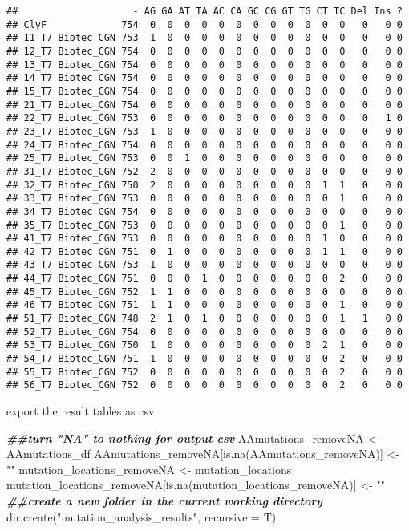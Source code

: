 \documentclass[
]{article}
\newenvironment{Shaded}{\begin{snugshade}}{\end{snugshade}}
\newcommand{\AttributeTok}[1]{\textcolor[rgb]{0.77,0.63,0.00}{#1}}
\newcommand{\DocumentationTok}[1]{\textcolor[rgb]{0.56,0.35,0.01}{\textbf{\textit{#1}}}}
\newcommand{\FunctionTok}[1]{\textcolor[rgb]{0.00,0.00,0.00}{#1}}
\newcommand{\NormalTok}[1]{#1}
\newcommand{\OtherTok}[1]{\textcolor[rgb]{0.56,0.35,0.01}{#1}}
\newcommand{\StringTok}[1]{\textcolor[rgb]{0.31,0.60,0.02}{#1}}
\begin{document}
\begin{verbatim}
##                    - AG GA AT TA AC CA GC CG GT TG CT TC Del Ins ?
## ClyF             754  0  0  0  0  0  0  0  0  0  0  0  0   0   0 0
## 11_T7 Biotec_CGN 753  1  0  0  0  0  0  0  0  0  0  0  0   0   0 0
## 12_T7 Biotec_CGN 754  0  0  0  0  0  0  0  0  0  0  0  0   0   0 0
## 13_T7 Biotec_CGN 754  0  0  0  0  0  0  0  0  0  0  0  0   0   0 0
## 14_T7 Biotec_CGN 754  0  0  0  0  0  0  0  0  0  0  0  0   0   0 0
## 15_T7 Biotec_CGN 754  0  0  0  0  0  0  0  0  0  0  0  0   0   0 0
## 21_T7 Biotec_CGN 754  0  0  0  0  0  0  0  0  0  0  0  0   0   0 0
## 22_T7 Biotec_CGN 753  0  0  0  0  0  0  0  0  0  0  0  0   0   1 0
## 23_T7 Biotec_CGN 753  1  0  0  0  0  0  0  0  0  0  0  0   0   0 0
## 24_T7 Biotec_CGN 754  0  0  0  0  0  0  0  0  0  0  0  0   0   0 0
## 25_T7 Biotec_CGN 753  0  0  1  0  0  0  0  0  0  0  0  0   0   0 0
## 31_T7 Biotec_CGN 752  2  0  0  0  0  0  0  0  0  0  0  0   0   0 0
## 32_T7 Biotec_CGN 750  2  0  0  0  0  0  0  0  0  0  1  1   0   0 0
## 33_T7 Biotec_CGN 753  0  0  0  0  0  0  0  0  0  0  0  1   0   0 0
## 34_T7 Biotec_CGN 754  0  0  0  0  0  0  0  0  0  0  0  0   0   0 0
## 35_T7 Biotec_CGN 753  0  0  0  0  0  0  0  0  0  0  0  1   0   0 0
## 41_T7 Biotec_CGN 753  0  0  0  0  0  0  0  0  0  0  1  0   0   0 0
## 42_T7 Biotec_CGN 751  0  1  0  0  0  0  0  0  0  0  1  1   0   0 0
## 43_T7 Biotec_CGN 753  1  0  0  0  0  0  0  0  0  0  0  0   0   0 0
## 44_T7 Biotec_CGN 751  0  0  0  1  0  0  0  0  0  0  0  2   0   0 0
## 45_T7 Biotec_CGN 752  1  1  0  0  0  0  0  0  0  0  0  0   0   0 0
## 46_T7 Biotec_CGN 751  1  1  0  0  0  0  0  0  0  0  0  1   0   0 0
## 51_T7 Biotec_CGN 748  2  1  0  1  0  0  0  0  0  0  0  1   1   0 0
## 52_T7 Biotec_CGN 754  0  0  0  0  0  0  0  0  0  0  0  0   0   0 0
## 53_T7 Biotec_CGN 750  1  0  0  0  0  0  0  0  0  0  2  1   0   0 0
## 54_T7 Biotec_CGN 751  1  0  0  0  0  0  0  0  0  0  0  2   0   0 0
## 55_T7 Biotec_CGN 752  0  0  0  0  0  0  0  0  0  0  0  2   0   0 0
## 56_T7 Biotec_CGN 752  0  0  0  0  0  0  0  0  0  0  0  2   0   0 0
\end{verbatim}

export the result tables as csv

\begin{Shaded}
\begin{Highlighting}[]
\DocumentationTok{\#\#turn "NA" to nothing for output csv}
\NormalTok{AAmutations\_removeNA }\OtherTok{\textless{}{-}}\NormalTok{ AAmutations\_df}
\NormalTok{AAmutations\_removeNA[}\FunctionTok{is.na}\NormalTok{(AAmutations\_removeNA)] }\OtherTok{\textless{}{-}} \StringTok{""}
\NormalTok{mutation\_locations\_removeNA }\OtherTok{\textless{}{-}}\NormalTok{ mutation\_locations}
\NormalTok{mutation\_locations\_removeNA[}\FunctionTok{is.na}\NormalTok{(mutation\_locations\_removeNA)] }\OtherTok{\textless{}{-}} \StringTok{""}
\DocumentationTok{\#\#create a new folder in the current working directory }
\FunctionTok{dir.create}\NormalTok{(}\StringTok{"mutation\_analysis\_results"}\NormalTok{, }\AttributeTok{recursive =}\NormalTok{ T)}
\end{Highlighting}
\end{Shaded}
\end{document}

